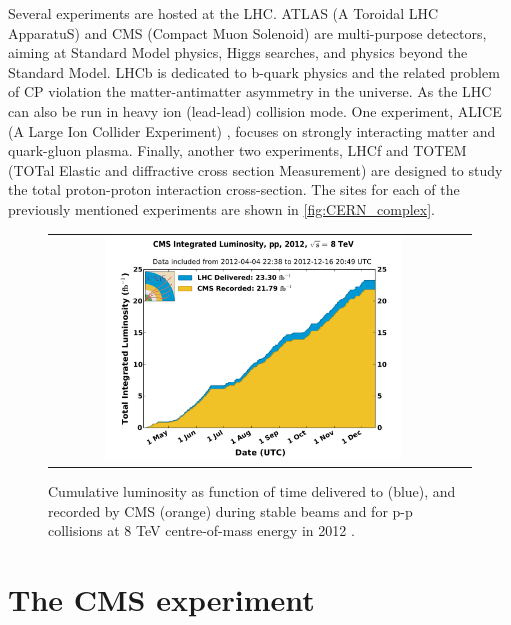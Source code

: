 Several experiments are hosted at the LHC. ATLAS (A Toroidal LHC ApparatuS) \cite{det::ATLAS} and CMS (Compact Muon Solenoid) \cite{Chatrchyan:2008zzk} are multi-purpose detectors, aiming at Standard Model physics, Higgs searches, and physics beyond the Standard Model. LHCb \cite{det::LHCb} is dedicated to b-quark physics and the related problem of CP violation the matter-antimatter asymmetry in the universe. As the LHC can also be run in heavy ion (lead-lead) collision mode. One experiment, ALICE (A Large Ion Collider Experiment) \cite{det::ALICE}, focuses on strongly interacting matter and quark-gluon plasma. Finally, another two experiments, LHCf \cite{Adriani:2008zz} and TOTEM (TOTal Elastic and diffractive cross section Measurement) \cite{Anelli:2008zza} are designed to study the total proton-proton interaction cross-section. The sites for each of the previously mentioned experiments are shown in \autoref{fig:CERN_complex}. 

\begin{figure}[tbh!]
	\centering
	\begin{tabular}{cc}
		\includegraphics[width=0.75\textwidth]{detector/pics/int_lumi_per_day_cumulative_pp_2012.pdf}
	\end{tabular}
	\caption{Cumulative luminosity as function of time delivered to (blue), and recorded by CMS (orange) during stable beams and for p-p collisions at 8 TeV centre-of-mass energy in 2012 \cite{CMS:LumiPublicResults}.}
	\label{fig:lumi_2012}
\end{figure}

\clearpage

\section{The CMS experiment}

